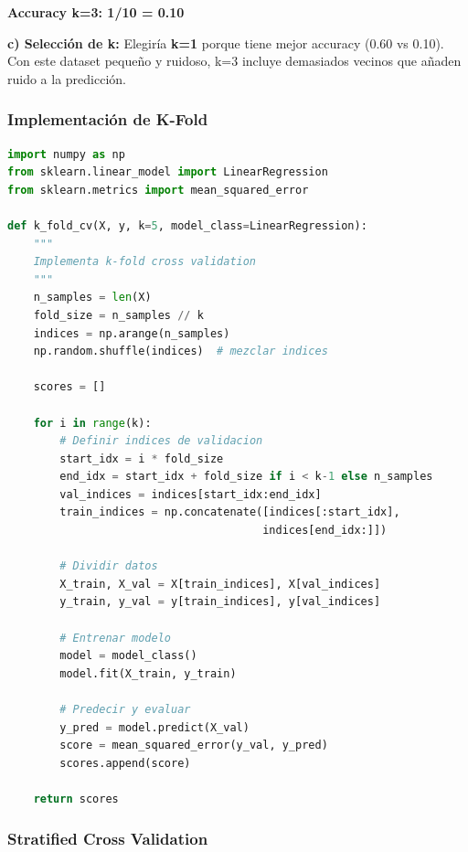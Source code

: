 \documentclass[12pt]{article}
\begin{document}
\textbf{Accuracy k=3: 1/10 = 0.10}

\vspace{1em}

\textbf{c) Selección de k:}
Elegiría \textbf{k=1} porque tiene mejor accuracy (0.60 vs 0.10). Con este dataset pequeño y ruidoso, k=3 incluye demasiados vecinos que añaden ruido a la predicción.

\subsubsection{Implementación de K-Fold}

\begin{lstlisting}[language=Python]
import numpy as np
from sklearn.linear_model import LinearRegression
from sklearn.metrics import mean_squared_error

def k_fold_cv(X, y, k=5, model_class=LinearRegression):
    """
    Implementa k-fold cross validation
    """
    n_samples = len(X)
    fold_size = n_samples // k
    indices = np.arange(n_samples)
    np.random.shuffle(indices)  # mezclar indices
    
    scores = []
    
    for i in range(k):
        # Definir indices de validacion
        start_idx = i * fold_size
        end_idx = start_idx + fold_size if i < k-1 else n_samples
        val_indices = indices[start_idx:end_idx]
        train_indices = np.concatenate([indices[:start_idx], 
                                       indices[end_idx:]])
        
        # Dividir datos
        X_train, X_val = X[train_indices], X[val_indices]
        y_train, y_val = y[train_indices], y[val_indices]
        
        # Entrenar modelo
        model = model_class()
        model.fit(X_train, y_train)
        
        # Predecir y evaluar
        y_pred = model.predict(X_val)
        score = mean_squared_error(y_val, y_pred)
        scores.append(score)
    
    return scores
\end{lstlisting}

\subsubsection{Stratified Cross Validation}
\end{document}
